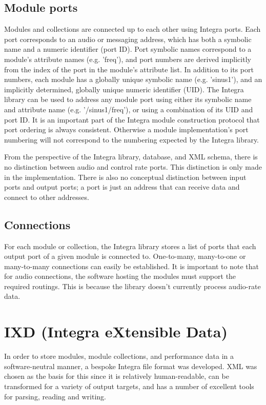 \subsection{Module ports}\label{subsec:module_ports} 

Modules and collections are connected up to each other using Integra ports. Each port corresponds to an audio or messaging address, which has both a symbolic name and a numeric identifier (port ID). Port symbolic names correspond to a module's attribute names (e.g. 'freq'), and port numbers are derived implicitly from the index of the port in the module's attribute list. In addition to its port numbers, each module has a globally unique symbolic name (e.g. 'sinus1'), and an implicitly determined, globally unique numeric identifier (UID). The Integra library can be used to address any module port using either its symbolic name and attribute name (e.g. '/sinus1/freq'), or using a combination of its UID and port ID. It is an important part of the Integra module construction protocol that port ordering is always consistent. Otherwise a module implementation's port numbering will not correspond to the numbering expected by the Integra library.

From the perspective of the Integra library, database, and XML schema,
there is no distinction between audio and control rate ports. This
distinction is only made in the implementation. There is also no
conceptual distinction between input ports and output ports; a port is
just an address that can receive data and connect to other addresses.

\subsection{Connections}\label{subsec:connections}

For each module or collection, the Integra library stores a list of ports that each output port of a given module is connected to. One-to-many, many-to-one or many-to-many connections can easily be established. It is important to note that for audio connections, the software hosting the modules must support the required routings. This is because the library doesn't currently process audio-rate data.

\section{IXD (Integra eXtensible Data)}\label{sec:ixd}

In order to store modules, module collections, and performance data in a software-neutral manner, a bespoke Integra file format was developed. XML was chosen as the basis for this since it is relatively human-readable, can be transformed for a variety of output targets, and has a number of excellent tools for parsing, reading and writing. 

